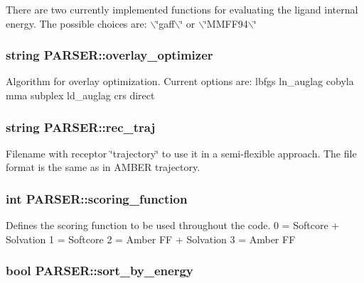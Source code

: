 There are two currently implemented functions for evaluating the ligand internal energy. The possible choices are: $\backslash$\char`\"{}gaff$\backslash$\char`\"{} or $\backslash$\char`\"{}MMFF94$\backslash$\char`\"{} \hypertarget{classPARSER_aeb177596ca3ca3cb2910a8ba3fe2c77e}{
\subsubsection[{overlay\_\-optimizer}]{\setlength{\rightskip}{0pt plus 5cm}string {\bf PARSER::overlay\_\-optimizer}}}
\label{classPARSER_aeb177596ca3ca3cb2910a8ba3fe2c77e}
Algorithm for overlay optimization. Current options are: lbfgs ln\_\-auglag cobyla mma subplex ld\_\-auglag crs direct \hypertarget{classPARSER_ae0e302d8902665dc3a9f9a42ae5e5a34}{
\subsubsection[{rec\_\-traj}]{\setlength{\rightskip}{0pt plus 5cm}string {\bf PARSER::rec\_\-traj}}}
\label{classPARSER_ae0e302d8902665dc3a9f9a42ae5e5a34}
Filename with receptor \char`\"{}trajectory\char`\"{} to use it in a semi-\/flexible approach. The file format is the same as in AMBER trajectory. \hypertarget{classPARSER_ad4acb599b6863a95916e0646d27acdd0}{
\subsubsection[{scoring\_\-function}]{\setlength{\rightskip}{0pt plus 5cm}int {\bf PARSER::scoring\_\-function}}}
\label{classPARSER_ad4acb599b6863a95916e0646d27acdd0}
Defines the scoring function to be used throughout the code. 0 = Softcore + Solvation 1 = Softcore 2 = Amber FF + Solvation 3 = Amber FF \hypertarget{classPARSER_a2b4a169dd1600254c33ebb5338342795}{
\subsubsection[{sort\_\-by\_\-energy}]{\setlength{\rightskip}{0pt plus 5cm}bool {\bf PARSER::sort\_\-by\_\-energy}}}
